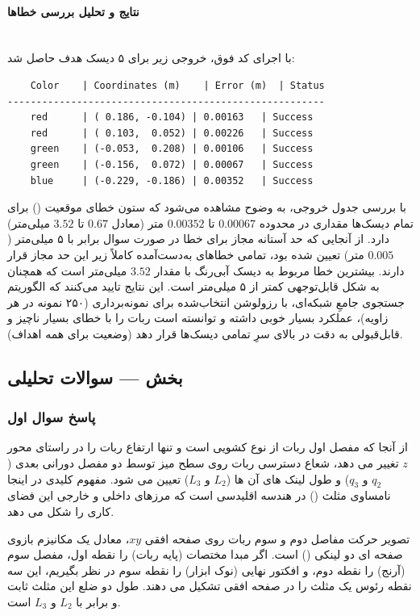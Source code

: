 \documentclass{article}
\begin{document}
\paragraph{نتایج و تحلیل بررسی خطاها}\mbox{}\\
با اجرای کد فوق، خروجی زیر برای ۵ دیسک هدف حاصل شد:

\begin{latin}
	\begin{verbatim}
	Color    | Coordinates (m)    | Error (m)  | Status
-------------------------------------------------------
	red      | ( 0.186, -0.104) | 0.00163   | Success
	red      | ( 0.103,  0.052) | 0.00226   | Success
	green    | (-0.053,  0.208) | 0.00106   | Success
	green    | (-0.156,  0.072) | 0.00067   | Success
	blue     | (-0.229, -0.186) | 0.00352   | Success
	\end{verbatim}
\end{latin}

با بررسی جدول خروجی، به وضوح مشاهده می‌شود که ستون خطای موقعیت () برای تمام دیسک‌ها مقداری در محدوده $0.00067$ تا $0.00352$ متر (معادل $0.67$ تا $3.52$ میلی‌متر) دارد. از آنجایی که حد آستانه مجاز برای خطا در صورت سوال برابر با ۵ میلی‌متر ($0.005$ متر) تعیین شده بود، تمامی خطاهای به‌دست‌آمده کاملاً زیر این حد مجاز قرار دارند.
بیشترین خطا مربوط به دیسک آبی‌رنگ با مقدار $3.52$ میلی‌متر است که همچنان به شکل قابل‌توجهی کمتر از ۵ میلی‌متر است. این نتایج تایید می‌کنند که الگوریتم جستجوی جامعِ شبکه‌ای، با رزولوشن انتخاب‌شده برای نمونه‌برداری (۲۵۰ نمونه در هر زاویه)، عملکرد بسیار خوبی داشته و توانسته است ربات را با خطای بسیار ناچیز و قابل‌قبولی به دقت در بالای سرِ تمامی دیسک‌ها قرار دهد (وضعیت  برای همه اهداف).

\subsection{بخش  --- سوالات تحلیلی}
\subsubsection{پاسخ سوال اول}

از آنجا که مفصل اول ربات  از نوع کشویی است و تنها ارتفاع ربات را در راستای محور $ z $ تغییر می دهد، شعاع دسترسی ربات روی سطح میز توسط دو مفصل دورانی بعدی ($ q_2 $ و $ q_3 $) و طول لینک های آن ها ($ L_2 $ و $ L_3 $) تعیین می شود. مفهوم کلیدی در اینجا نامساوی مثلث () در هندسه اقلیدسی است که مرزهای داخلی و خارجی این فضای کاری را شکل می دهد.

تصویر حرکت مفاصل دوم و سوم ربات روی صفحه افقی $ xy $، معادل یک مکانیزم بازوی صفحه ای دو لینکی () است. اگر مبدا مختصات (پایه ربات) را نقطه اول، مفصل سوم (آرنج) را نقطه دوم، و افکتور نهایی (نوک ابزار) را نقطه سوم در نظر بگیریم، این سه نقطه رئوس یک مثلث را در صفحه افقی تشکیل می دهند. طول دو ضلع این مثلث ثابت و برابر با $ L_2 $ و $ L_3 $ است.
\end{document}
